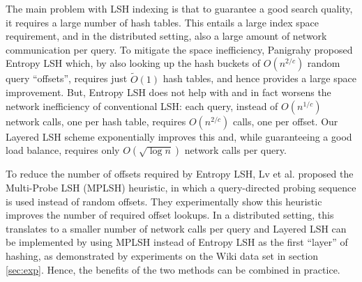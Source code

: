 \documentclass{acm_proc_article-sp}
\numberwithin{equation}{section}
\numberwithin{figure}{section}
\newcommand{\comment}[1]{}
\begin{document}
The main problem with LSH indexing is that to guarantee a good search quality, it requires a large number of hash tables. This entails a large index space requirement, and in the distributed setting, also a large amount of network communication per query. To mitigate the space inefficiency, Panigrahy \cite{P06} proposed Entropy LSH which, by also looking up the hash buckets of $O(n^{2/c})$ random query ``offsets'', requires just $\tilde{O}(1)$ hash tables, and hence provides a large space improvement. But, Entropy LSH does not help with and in fact worsens the network inefficiency of conventional LSH: each query, instead of $O(n^{1/c})$ network calls, one per hash table, requires $O(n^{2/c})$ calls, one per offset. Our Layered LSH scheme exponentially improves this and, while guaranteeing a good load balance, requires only $O(\sqrt{\log n})$ network calls per query.

To reduce the number of offsets required by Entropy LSH, Lv et al. \cite{Charikar:multiprobe} proposed the Multi-Probe LSH (MPLSH) heuristic, in which a query-directed probing sequence is used instead of random offsets. They experimentally show this heuristic improves the number of required offset lookups. In a distributed setting, this translates to a smaller number of network calls per query and Layered LSH can be implemented by using MPLSH instead of Entropy LSH as the first ``layer'' of hashing, as demonstrated by experiments on the Wiki data set in section \ref{sec:exp}. Hence, the benefits of the two methods can be combined in practice.

\comment{
To reduce the number of offsets required by Entropy LSH, Lv et al. \cite{Charikar:multiprobe} proposed the Multi-Probe LSH (MPLSH) heuristic, in which a query-directed probing sequence is used instead of random offsets. They experimentally show this heuristic improves the number of required offset lookups. In a distributed setting, this translates to a smaller number of network calls per query, which is the main goal in Layered LSH as well. Clearly, Layered LSH can be implemented by using MPLSH instead of Entropy LSH as the first ``layer'' of hashing. Hence, the benefits of the two methods can be combined in practice, as demonstrated by experiments on the Wiki data set in section \ref{sec:exp}. However, the experiments by Lv et al. \cite{Charikar:multiprobe} show a modest constant factor reduction in the number of offsets compared to Entropy LSH. Hence, since Layered LSH, besides a theoretical exponential improvement, experimentally shows a factor $100$ reduction in network load compared to Entropy LSH, it is not clear if the marginal benefit from switching the first layer to MPLSH is significant enough to justify its much more complicated offset generation. Furthermore, MPLSH has no theoretical guarantees, while using Entropy LSH as the first layer of hashing allows for the strong theoretical guarantees on both network cost and load balance of Layered LSH proved in this paper. Hence overall, in this paper, we focus on Entropy LSH as the first layer of hashing in Layered LSH.}
\end{document}
